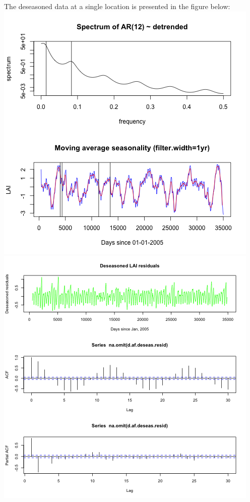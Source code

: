 \documentclass[11pt]{article}
\begin{document}
The deseasoned data at a single location is presented in the figure below:
\includegraphics{../img/deseasonalization_spectrum.png}
\includegraphics{../img/deseasonalization_resid.png}
\end{document}
